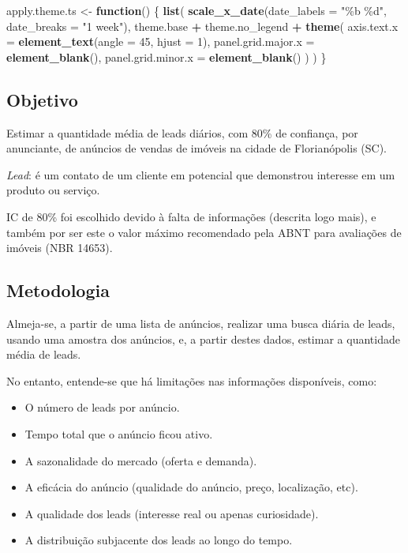 \documentclass[
]{article}
\newenvironment{Shaded}{\begin{snugshade}}{\end{snugshade}}
\newcommand{\AttributeTok}[1]{\textcolor[rgb]{0.13,0.29,0.53}{#1}}
\newcommand{\ControlFlowTok}[1]{\textcolor[rgb]{0.13,0.29,0.53}{\textbf{#1}}}
\newcommand{\DecValTok}[1]{\textcolor[rgb]{0.00,0.00,0.81}{#1}}
\newcommand{\FunctionTok}[1]{\textcolor[rgb]{0.13,0.29,0.53}{\textbf{#1}}}
\newcommand{\NormalTok}[1]{#1}
\newcommand{\OtherTok}[1]{\textcolor[rgb]{0.56,0.35,0.01}{#1}}
\newcommand{\SpecialCharTok}[1]{\textcolor[rgb]{0.81,0.36,0.00}{\textbf{#1}}}
\newcommand{\StringTok}[1]{\textcolor[rgb]{0.31,0.60,0.02}{#1}}
\providecommand{\tightlist}{%
  \setlength{\itemsep}{0pt}\setlength{\parskip}{0pt}}
\begin{document}
\begin{Shaded}
\begin{Highlighting}[]
\NormalTok{apply.theme.ts }\OtherTok{\textless{}{-}} \ControlFlowTok{function}\NormalTok{() \{}
  \FunctionTok{list}\NormalTok{(}
    \FunctionTok{scale\_x\_date}\NormalTok{(}\AttributeTok{date\_labels =} \StringTok{"\%b \%d"}\NormalTok{, }\AttributeTok{date\_breaks =} \StringTok{"1 week"}\NormalTok{),}
\NormalTok{    theme.base }\SpecialCharTok{+}\NormalTok{ theme.no\_legend }\SpecialCharTok{+}
      \FunctionTok{theme}\NormalTok{(}
        \AttributeTok{axis.text.x =} \FunctionTok{element\_text}\NormalTok{(}\AttributeTok{angle =} \DecValTok{45}\NormalTok{, }\AttributeTok{hjust =} \DecValTok{1}\NormalTok{),}
        \AttributeTok{panel.grid.major.x =} \FunctionTok{element\_blank}\NormalTok{(),}
        \AttributeTok{panel.grid.minor.x =} \FunctionTok{element\_blank}\NormalTok{()}
\NormalTok{      )}
\NormalTok{  )}
\NormalTok{\}}
\end{Highlighting}
\end{Shaded}

\subsection{Objetivo}\label{objetivo}

Estimar a quantidade média de leads diários, com 80\% de confiança, por
anunciante, de anúncios de vendas de imóveis na cidade de Florianópolis
(SC).

\emph{Lead}: é um contato de um cliente em potencial que demonstrou
interesse em um produto ou serviço.

IC de 80\% foi escolhido devido à falta de informações (descrita logo
mais), e também por ser este o valor máximo recomendado pela ABNT para
avaliações de imóveis (NBR 14653).

\subsection{Metodologia}\label{metodologia}

Almeja-se, a partir de uma lista de anúncios, realizar uma busca diária
de leads, usando uma amostra dos anúncios, e, a partir destes dados,
estimar a quantidade média de leads.

No entanto, entende-se que há limitações nas informações disponíveis,
como:

\begin{itemize}
\tightlist
\item
  O número de leads por anúncio.
\item
  Tempo total que o anúncio ficou ativo.
\item
  A sazonalidade do mercado (oferta e demanda).
\item
  A eficácia do anúncio (qualidade do anúncio, preço, localização, etc).
\item
  A qualidade dos leads (interesse real ou apenas curiosidade).
\item
  A distribuição subjacente dos leads ao longo do tempo.
\end{itemize}
\end{document}
